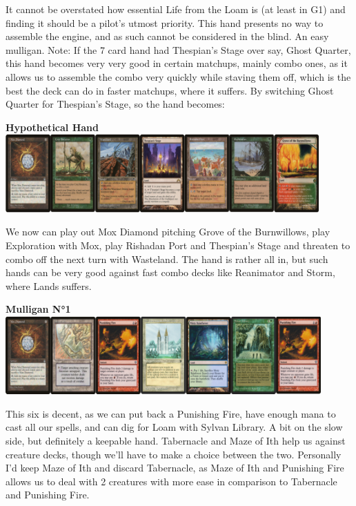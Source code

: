 \documentclass{report}
\begin{document}
It cannot be overstated how essential Life from the Loam is (at least in G1) and finding it should be a pilot's utmost priority. This hand presents no way to assemble the engine, and as such cannot be considered in the blind. An easy mulligan.
Note: If the 7 card hand had Thespian's Stage over say, Ghost Quarter, this hand becomes very very good in certain matchups, mainly combo ones, as it allows us to assemble the combo very quickly while staving them off, which is the best the deck can do in faster matchups, where it suffers. By switching Ghost Quarter for Thespian's Stage, so the hand becomes:
\begin{center}
\textbf{Hypothetical Hand\\}
\includegraphics [width =\textwidth, height = 3cm] {rgmull2}
\end{center}
We now can play out Mox Diamond pitching Grove of the Burnwillows, play Exploration with Mox, play Rishadan Port and Thespian's Stage and threaten to combo off the next turn with Wasteland. The hand is rather all in, but such hands can be very good against fast combo decks like Reanimator and Storm, where Lands suffers.
\newpage
\begin{center}
\textbf{Mulligan N°1\\}
\includegraphics [width =\textwidth, height = 3cm] {rgmull3}
\end{center}
This six is decent, as we can put back a Punishing Fire, have enough mana to cast all our spells, and can dig for Loam with Sylvan Library. A bit on the slow side, but definitely a keepable hand. Tabernacle and Maze of Ith help us against creature decks, though we'll have to make a choice between the two. Personally I'd keep Maze of Ith and discard Tabernacle, as Maze of Ith and Punishing Fire allows us to deal with 2 creatures with more ease in comparison to Tabernacle and Punishing Fire.\\\\\\
\end{document}
